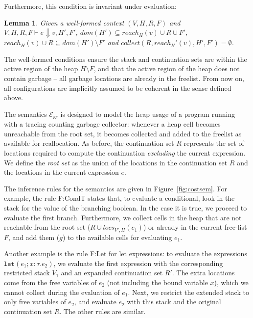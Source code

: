 \documentclass{easychair}
\newcommand{\ms}[1]{\ensuremath{\mathsf{#1}}}
\newcommand{\irl}[1]{\mathtt{#1}}
\newcounter{rule}
\newcommand{\gcSem}{\ensuremath{\mathcal{E}_{\ms{gc}}}}
\newtheorem{lemma}[theorem]{Lemma}
\theoremstyle{definition}
\begin{document}
Furthermore, this condition is invariant under evaluation:
\begin{lemma}\label{itm:eager}
	Given a well-formed context $(V,H,R,F)$ and $V,H,R,F \vdash e \Downarrow v,H',F'$, 
	$dom(H') \subseteq reach_H(v) \cup R \cup F'$,
	$reach_H(v) \cup R \subseteq dom(H') \setminus F'$ and
	$collect(R,reach_H'(v),H',F') = \emptyset$.
\end{lemma}
The well-formed conditions ensure the stack and continuation sets are within the active region
of the heap $H \setminus F$, and that
the active region of the heap does not contain garbage -- all garbage locations 
are already in the freelist. From now on, all configurations are implicitly assumed to be coherent
in the sense defined above. 

The semantics \gcSem{} is designed to model the heap usage of a program running with a 
tracing counting garbage collector: whenever a heap cell becomes unreachable from the 
root set, it becomes collected and added to the freelist as available for reallocation.
As before, the continuation set $R$ represents the set of locations 
required to compute the continuation \emph{excluding} the current expression.
We define the  \emph{root set} as the union of the locations in the continuation set $R$ 
and the locations in the current expression $e$. 

The inference rules for the semantics are given in Figure~\ref{fig:costsem}.
For example, the rule F:CondT states that, to evaluate a conditional, 
look in the stack for the value of the branching boolean.
In the case it is true, we proceed to evaluate the first branch.
Furthermore, we collect cells in the heap
that are not reachable from the root set ($R \cup locs_{V',H}(e_1)$) 
or already in the current free-list
$F$, and add them ($g$) to the available cells for evaluating $e_1$. 

Another example is the rule F:Let for let expressions:
to evaluate the expressions $\irl{let}(e_1; x {:} \tau.e_2)$, we evaluate the first 
expression with the corresponding restricted stack $V_1$ and an expanded continuation set $R'$. 
The extra locations come from the free variables of $e_2$ (not including the bound variable $x$),
which we cannot collect during the evaluation of $e_1$. Next, we restrict the extended stack 
to only free variables of $e_2$, and evaluate $e_2$ with this stack and the original continuation 
set $R$. The other rules are similar. 
\end{document}
